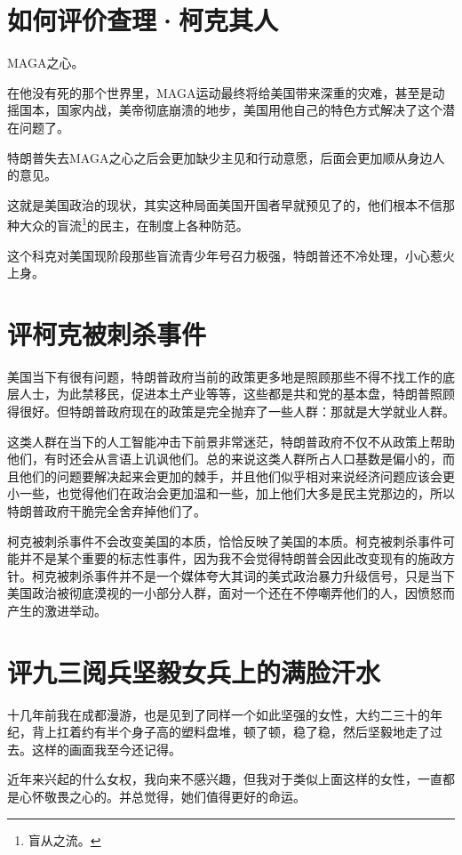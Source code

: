 \documentclass[12pt,oneside]{book}
\begin{document}
\chapter{如何评价查理·柯克其人}
MAGA之心。

在他没有死的那个世界里，MAGA运动最终将给美国带来深重的灾难，甚至是动摇国本，国家内战，美帝彻底崩溃的地步，美国用他自己的特色方式解决了这个潜在问题了。

特朗普失去MAGA之心之后会更加缺少主见和行动意愿，后面会更加顺从身边人的意见。

这就是美国政治的现状，其实这种局面美国开国者早就预见了的，他们根本不信那种大众的盲流\footnote{盲从之流。}的民主，在制度上各种防范。

这个科克对美国现阶段那些盲流青少年号召力极强，特朗普还不冷处理，小心惹火上身。



\chapter{评柯克被刺杀事件}
美国当下有很有问题，特朗普政府当前的政策更多地是照顾那些不得不找工作的底层人士，为此禁移民，促进本土产业等等，这些都是共和党的基本盘，特朗普照顾得很好。但特朗普政府现在的政策是完全抛弃了一些人群：那就是大学就业人群。

这类人群在当下的人工智能冲击下前景非常迷茫，特朗普政府不仅不从政策上帮助他们，有时还会从言语上讥讽他们。总的来说这类人群所占人口基数是偏小的，而且他们的问题要解决起来会更加的棘手，并且他们似乎相对来说经济问题应该会更小一些，也觉得他们在政治会更加温和一些，加上他们大多是民主党那边的，所以特朗普政府干脆完全舍弃掉他们了。

柯克被刺杀事件不会改变美国的本质，恰恰反映了美国的本质。柯克被刺杀事件可能并不是某个重要的标志性事件，因为我不会觉得特朗普会因此改变现有的施政方针。柯克被刺杀事件并不是一个媒体夸大其词的美式政治暴力升级信号，只是当下美国政治被彻底漠视的一小部分人群，面对一个还在不停嘲弄他们的人，因愤怒而产生的激进举动。



\chapter{评九三阅兵坚毅女兵上的满脸汗水}
十几年前我在成都漫游，也是见到了同样一个如此坚强的女性，大约二三十的年纪，背上扛着约有半个身子高的塑料盘堆，顿了顿，稳了稳，然后坚毅地走了过去。这样的画面我至今还记得。

近年来兴起的什么女权，我向来不感兴趣，但我对于类似上面这样的女性，一直都是心怀敬畏之心的。并总觉得，她们值得更好的命运。
\end{document}
